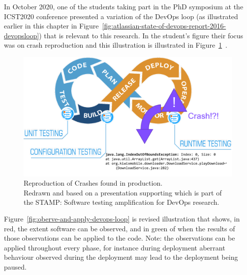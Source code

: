 In October 2020, one of the students taking part in the PhD symposium at the ICST2020 conference presented a variation of the DevOps loop (as illustrated earlier in this chapter in Figure~\ref{fig:atlassian-state-of-devops-report-2016-devopsloop}) that is relevant to this research. In the student's figure their focus was on crash reproduction and this illustration is illustrated in Figure~\ref{fig:crash-reproduction-icst2020}~. %

\begin{figure}
    \includegraphics[width=\linewidth]{images/my/delft-crash-testing-redrawn.pdf}
    \caption[Reproduction of crashes in production]{Reproduction of Crashes found in production. \\Redrawn and based on a presentation supporting \cite{derakhshanfar2020_well_informed_test_case_generation_and_crash_reproduction} which is part of the STAMP: Software testing amplification for DevOps research.}
    \label{fig:crash-reproduction-icst2020}
\end{figure}

Figure~\ref{fig:oberve-and-apply-devops-loop} is revised illustration that shows, in red, the extent software can be observed, and in green of when the results of those observations can be applied to the code. Note: the observations can be applied throughout every phase, for instance during deployment aberrant behaviour observed during the deployment may lead to the deployment being paused.

